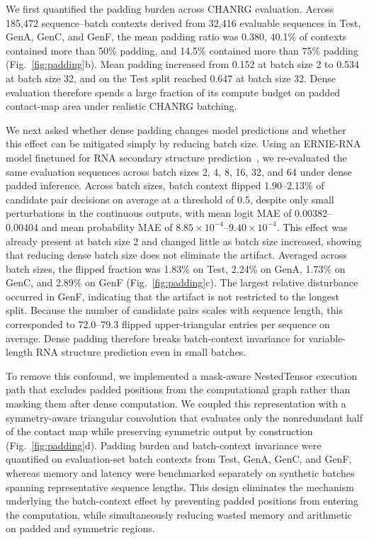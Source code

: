 \documentclass[pdflatex,sn-mathphys-num]{sn-jnl}%
\theoremstyle{thmstyleone}%
\theoremstyle{thmstyletwo}%
\theoremstyle{thmstylethree}%
\begin{document}
We first quantified the padding burden across CHANRG evaluation.
Across 185{,}472 sequence--batch contexts derived from 32{,}416 evaluable sequences in Test, GenA, GenC, and GenF, the mean padding ratio was 0.380, 40.1\% of contexts contained more than 50\% padding, and 14.5\% contained more than 75\% padding (Fig.~\ref{fig:padding}b).
Mean padding increased from 0.152 at batch size 2 to 0.534 at batch size 32, and on the Test split reached 0.647 at batch size 32.
Dense evaluation therefore spends a large fraction of its compute budget on padded contact-map area under realistic CHANRG batching.

We next asked whether dense padding changes model predictions and whether this effect can be mitigated simply by reducing batch size.
Using an ERNIE-RNA model finetuned for RNA secondary structure prediction~\cite{yin2025ernie}, we re-evaluated the same evaluation sequences across batch sizes 2, 4, 8, 16, 32, and 64 under dense padded inference.
Across batch sizes, batch context flipped 1.90--2.13\% of candidate pair decisions on average at a threshold of 0.5, despite only small perturbations in the continuous outputs, with mean logit MAE of 0.00382--0.00404 and mean probability MAE of $8.85\times10^{-4}$--$9.40\times10^{-4}$.
This effect was already present at batch size 2 and changed little as batch size increased, showing that reducing dense batch size does not eliminate the artifact.
Averaged across batch sizes, the flipped fraction was 1.83\% on Test, 2.24\% on GenA, 1.73\% on GenC, and 2.89\% on GenF (Fig.~\ref{fig:padding}c).
The largest relative disturbance occurred in GenF, indicating that the artifact is not restricted to the longest split.
Because the number of candidate pairs scales with sequence length, this corresponded to 72.0--79.3 flipped upper-triangular entries per sequence on average.
Dense padding therefore breaks batch-context invariance for variable-length RNA structure prediction even in small batches.

To remove this confound, we implemented a mask-aware NestedTensor execution path that excludes padded positions from the computational graph rather than masking them after dense computation.
We coupled this representation with a symmetry-aware triangular convolution that evaluates only the nonredundant half of the contact map while preserving symmetric output by construction (Fig.~\ref{fig:padding}d).
Padding burden and batch-context invariance were quantified on evaluation-set batch contexts from Test, GenA, GenC, and GenF, whereas memory and latency were benchmarked separately on synthetic batches spanning representative sequence lengths.
This design eliminates the mechanism underlying the batch-context effect by preventing padded positions from entering the computation, while simultaneously reducing wasted memory and arithmetic on padded and symmetric regions.
\end{document}
